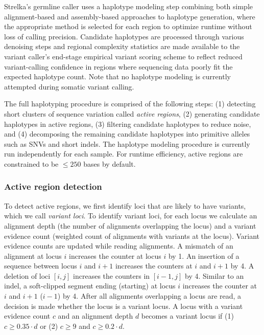\documentclass{article}
\begin{document}
Strelka's germline caller uses a haplotype modeling step combining both simple alignment-based and assembly-based approaches to haplotype generation, where the appropriate method is selected for each region to optimize runtime without loss of calling precision. Candidate haplotypes are processed through various denoising steps and regional complexity statistics are made available to the variant caller's end-stage empirical variant scoring scheme to reflect reduced variant-calling confidence in regions where sequencing data poorly fit the expected haplotype count. Note that no haplotype modeling is currently attempted during somatic variant calling.

The full haplotyping procedure is comprised of the following steps: (1) detecting short clusters of sequence variation called {\em active regions}, (2) generating candidate haplotypes in active regions, (3) filtering candidate haplotypes to reduce noise, and (4) decomposing the remaining candidate haplotypes into primitive alleles such as SNVs and short indels. The haplotype modeling procedure is currently run independently for each sample. For runtime efficiency, active regions are constrained to be $\leq 250$ bases by default.


\subsubsection{Active region detection}
To detect active regions, we first identify loci that are likely to have variants, which we call {\em variant loci}. To identify variant loci, for each locus we calculate an alignment depth (the number of alignments overlapping the locus) and a variant evidence count (weighted count of alignments with variants at the locus). Variant evidence counts are updated while reading alignments. A mismatch of an alignment at locus $i$ increases the counter at locus $i$ by 1. An insertion of a sequence between locus $i$ and $i+1$ increases the counters at $i$ and $i+1$ by 4. A deletion of loci $[i,j]$ increases the counters in $[i-1,j]$ by 4. Similar to an indel, a soft-clipped segment ending (starting) at locus $i$ increases the counter at $i$ and $i+1$ ($i-1$) by 4. After all alignments overlapping a locus are read, a decision is made whether the locus is a variant locus. A locus with a variant evidence count $c$ and an alignment depth $d$ becomes a variant locus if (1) $c \geq 0.35 \cdot d$ or (2) $c \geq 9$ and $c \geq 0.2 \cdot d$.
\end{document}
